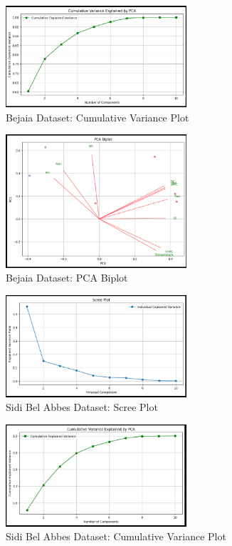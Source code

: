 \documentclass[12pt]{article}
\begin{document}
\begin{figure}[h!]
  \centering
  \includegraphics[width=0.6\textwidth]{images/svd_pca_lda/cum_1.png}
  \caption{Bejaia Dataset: Cumulative Variance Plot}
\end{figure}

\begin{figure}[h!]
  \centering
  \includegraphics[width=0.6\textwidth]{images/svd_pca_lda/biplot_1.png}
  \caption{Bejaia Dataset: PCA Biplot}
\end{figure}

\begin{figure}[h!]
  \centering
  \includegraphics[width=0.6\textwidth]{images/svd_pca_lda/scree_2.png}
  \caption{Sidi Bel Abbes Dataset: Scree Plot}
\end{figure}

\begin{figure}[h!]
  \centering
  \includegraphics[width=0.6\textwidth]{images/svd_pca_lda/cum_2.png}
  \caption{Sidi Bel Abbes Dataset: Cumulative Variance Plot}
\end{figure}
\end{document}
